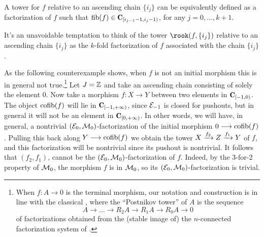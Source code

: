 \begin{remark}
A tower for $f$ relative to an ascending chain $\{i_j\}$ can be equivalently defined as a factorization of $f$ such that $\mathrm{fib}(f)\in \C_{[i_{j-1}-1,i_j-1)}$, for any $j=0,\dots,k+1$.
\end{remark}
\begin{remark}
It's an unavoidable temptation to think of the tower $\rook(f,\{i_j\})$ relative to an ascending chain $\{i_j\}$ as the $k$-fold factorization of $f$ associated with the chain $\{i_j\}$. 

As the following counterexample shows, when $f$ is not an initial morphism this is in general not true.\footnote{When $f\colon A\to 0$ is the terminal morphism, our notation and construction is in line with the classical \cite{LurieHA}, where the ``Postnikov tower'' of $A$ is the sequence
\[
A\to \dots \to R_2A\to R_1A\to R_0A \to 0
\]
of factorizations obtained from the (stable image of) the $n$-connected factorization system of \cite{Joy}.} Let $J=\mathbb{Z} $ and take an ascending chain consisting of solely the element $0$. Now take a morphism $f\colon X\to Y$ between two elements in $\C_{[-1,0)}$. The object $\operatorname{cofib}(f)$ will lie in $\C_{[-1,+\infty)}$, since $\mathcal{E}_{-1}$ is closed for pushouts, but in general it will not be an element in $\C_{[0,+\infty)}$. In other words, we will have, in general, a nontrivial $(\mathcal{E}_0,\mathcal{M}_0)$-factorization of the initial morphism $0\longrightarrow \operatorname{cofib}(f)$. Pulling this back along $Y\longrightarrow \operatorname{cofib}(f)$ we obtain the tower $X\xrightarrow{f_2} Z\xrightarrow{f_1} Y$ of $f$, and this factorization will be nontrivial since its pushout is nontrivial. It follows that $(f_2,f_1)$, cannot be the $(\mathcal{E}_0,\mathcal{M}_0)$-factorization of $f$. Indeed, by the 3-for-2 property of $\mathcal{M}_0$, the morphism $f$ is in $\mathcal{M}_0$, so its $(\mathcal{E}_0,\mathcal{M}_0)$-factorization is trivial. 
\end{remark}
